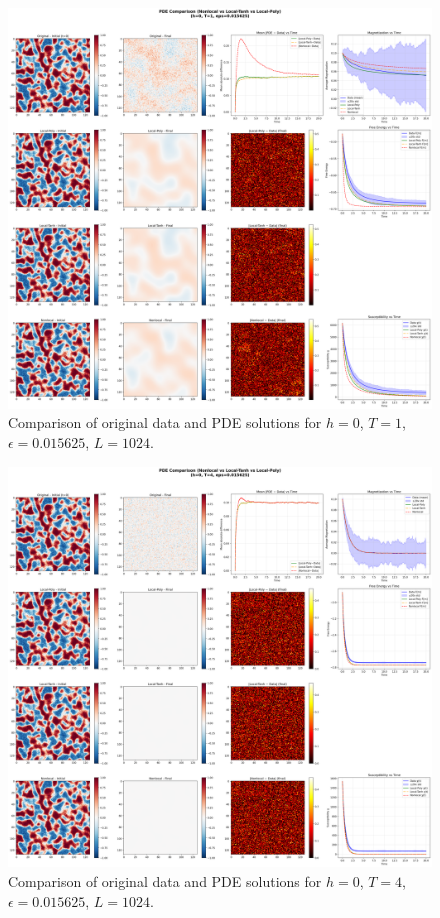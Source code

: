 \documentclass[11pt,a4paper]{article}
\begin{document}
\begin{figure}[!h]
    \centering
    \includegraphics[width=1.0\textwidth]{fig/compare_pde_solvers_L1024_h0_T1_eps0.015625.png}
    \caption{Comparison of original data and PDE solutions for $h=0$, $T=1$, $\epsilon=0.015625$, $L=1024$.}
    \label{fig:pde_comparison_h0_T1_eps0.015625}
\end{figure}


\begin{figure}[!h]
    \centering
    \includegraphics[width=1.0\textwidth]{fig/compare_pde_solvers_L1024_h0_T4_eps0.015625.png}
    \caption{Comparison of original data and PDE solutions for $h=0$, $T=4$, $\epsilon=0.015625$, $L=1024$.}
    \label{fig:pde_comparison_h0_T4_eps0.015625}
\end{figure}
\end{document}
